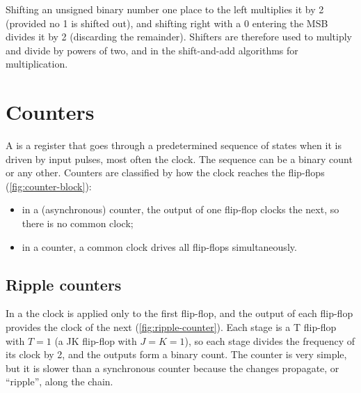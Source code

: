 
\begin{keypoint}
Shifting an unsigned binary number one place to the left multiplies it by 2 (provided no 1 is shifted out), and shifting right with a 0 entering the MSB divides it by 2 (discarding the remainder). Shifters are therefore used to multiply and divide by powers of two, and in the shift-and-add algorithms for multiplication.
\end{keypoint}

\section{Counters}\label{sec:counters}
A  is a register that goes through a predetermined sequence of states when it is driven by input pulses, most often the clock. The sequence can be a binary count or any other. Counters are classified by how the clock reaches the flip-flops (\cref{fig:counter-block}):
\begin{itemize}
  \item in a  (asynchronous) counter, the output of one flip-flop clocks the next, so there is no common clock;
  \item in a  counter, a common clock drives all flip-flops simultaneously.
\end{itemize}


\subsection{Ripple counters}
In a  the clock is applied only to the first flip-flop, and the output of each flip-flop provides the clock of the next (\cref{fig:ripple-counter}). Each stage is a T flip-flop with $T=1$ (a JK flip-flop with $J=K=1$), so each stage divides the frequency of its clock by 2, and the outputs form a binary count. The counter is very simple, but it is slower than a synchronous counter because the changes propagate, or ``ripple'', along the chain.



